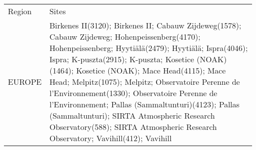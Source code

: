 \documentclass[journal abbreviation, manuscript]{copernicus}
\begin{document}
\clearpage

\begin{table}
 \tiny
 \begin{tabularx}{\textwidth}{lX}
  \tophline
  Region   & Sites                                                                                                                                                                                                                                                                                                                                                                                                                                                                                                                                                                                                                                                                                                                                                                                                                                                                                                                                                                                                                                                                                                                                                                                                                                                                              \\
  \middlehline
  EUROPE   & Birkenes II(3120); Birkenes II; Cabauw Zijdeweg(1578); Cabauw Zijdeweg; Hohenpeissenberg(4170); Hohenpeissenberg; Hyytiälä(2479); Hyytiälä; Ispra(4046); Ispra; K-puszta(2915); K-puszta; Kosetice (NOAK)(1464); Kosetice (NOAK); Mace Head(4115); Mace Head; Melpitz(1075); Melpitz; Observatoire Perenne de l'Environnement(1330); Observatoire Perenne de l'Environnement; Pallas (Sammaltunturi)(4123); Pallas (Sammaltunturi); SIRTA Atmospheric Research Observatory(588); SIRTA Atmospheric Research Observatory; Vavihill(412); Vavihill                                                                                                                                                                                                                                                                                                                                                                                                                                                                                                                                                                                                                                                                                                                                   \\

\end{tabularx}
\end{table}
\end{document}
